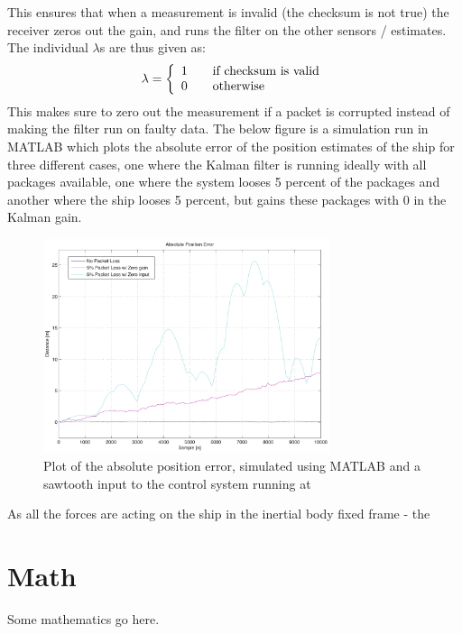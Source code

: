 \documentclass{ifacconf}
\begin{document}
This ensures that when a measurement is invalid (the checksum is not true) the receiver zeros out the gain, and runs the filter on the other sensors / estimates. The individual $\lambda$s are thus given as:
\begin{align}
\lambda = 
\left\{
  \begin{array}{l l}
    1 & \quad \text{if checksum is valid}\\
    0 & \quad \text{otherwise}
  \end{array} \right.
\end{align} 
This makes sure to zero out the measurement if a packet is corrupted instead of making the filter run on faulty data. The below figure is a simulation run in MATLAB which plots the absolute error of the position estimates of the ship for three different cases, one where the Kalman filter is running ideally with all packages available, one where the system looses 5 percent of the packages and another where the ship looses 5 percent, but gains these packages with 0 in the Kalman gain. 
\begin{figure}
	\begin{center}
		\includegraphics[width=8.4cm]{img/abspos}    %
		\caption{Plot of the absolute position error, simulated using MATLAB and a sawtooth input to the control system running at }  %
		\label{fig:3points}               
	\end{center}                                 %
\end{figure}


As all the forces are acting on the ship in the inertial body fixed frame - the 

\section{Math}
Some mathematics go here. 
\end{document}
